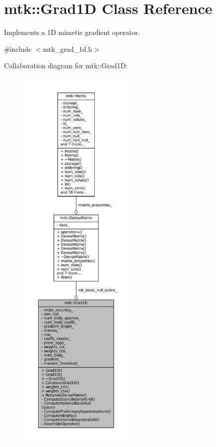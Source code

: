 \hypertarget{classmtk_1_1Grad1D}{\section{mtk\-:\-:Grad1\-D Class Reference}
\label{classmtk_1_1Grad1D}
}


Implements a 1\-D mimetic gradient operator.  




{\ttfamily \#include $<$mtk\-\_\-grad\-\_\-1d.\-h$>$}



Collaboration diagram for mtk\-:\-:Grad1\-D\-:\nopagebreak
\begin{figure}[H]
\begin{center}
\leavevmode
\includegraphics[height=550pt]{classmtk_1_1Grad1D__coll__graph}
\end{center}
\end{figure}
